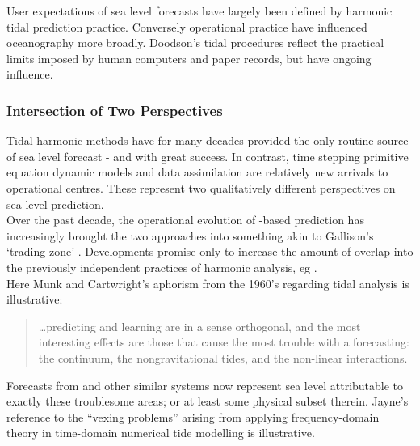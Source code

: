 User expectations of sea level forecasts have largely been defined by harmonic tidal prediction practice. 
Conversely operational practice have influenced oceanography more broadly. Doodson's \citep{Doodson:1928wf} tidal procedures reflect the practical limits imposed by human computers and paper records, but have ongoing influence. \\

\subsubsection{Intersection of Two Perspectives}
\label{S:two_perspectives}

Tidal harmonic methods have for many decades provided the only routine source of sea level forecast - and with great success.  
In contrast, time stepping primitive equation dynamic models and data assimilation are relatively new arrivals to operational centres.  
These represent two qualitatively different perspectives on sea level prediction.\\



Over the past decade, the operational evolution of \OGCM-based prediction has increasingly brought the two approaches into something akin to Gallison's `trading zone' \citep{Galison:1996uc}.
Developments promise only to increase the amount of overlap into the previously independent practices of harmonic analysis, eg \cite{Arbic:2010us}.\\
Here Munk and Cartwright's aphorism from the 1960's regarding tidal analysis is illustrative:
\begin{quote}
\dots predicting and learning are in a sense orthogonal, and the most interesting effects are those that cause the most trouble with a forecasting: the continuum, the nongravitational tides, and the non-linear interactions.\citep{Munk:1966ts} 
\end{quote}
Forecasts from \BL{} and other similar systems now represent sea level attributable to exactly these troublesome areas; or at least some physical subset therein.
Jayne's reference to the ``vexing problems'' \citep[pp812]{Jayne:2001tr} arising from applying frequency-domain theory in time-domain numerical tide modelling is illustrative.


